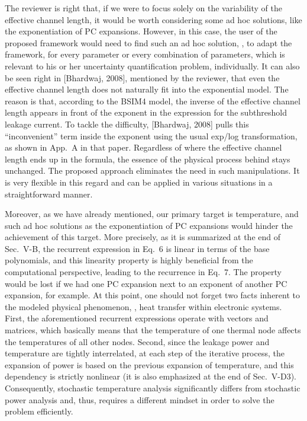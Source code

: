 \begin{authors}
The reviewer is right that, if we were to focus solely on the variability of the effective channel length, it would be worth considering some ad hoc solutions, like the exponentiation of PC expansions.
However, in this case, the user of the proposed framework would need to find such an ad hoc solution, \ie, to adapt the framework, for every parameter or every combination of parameters, which is relevant to his or her uncertainty quantification problem, individually.
It can also be seen right in [Bhardwaj, 2008], mentioned by the reviewer, that even the effective channel length does not naturally fit into the exponential model.
The reason is that, according to the BSIM4 model, the inverse of the effective channel length appears in front of the exponent in the expression for the subthreshold leakage current.
To tackle the difficulty, [Bhardwaj, 2008] pulls this ``inconvenient'' term inside the exponent using the usual exp/log transformation, as shown in App.~A in that paper.
Regardless of where the effective channel length ends up in the formula, the essence of the physical process behind stays unchanged.
The proposed approach eliminates the need in such manipulations.
It is very flexible in this regard and can be applied in various situations in a straightforward manner.

Moreover, as we have already mentioned, our primary target is temperature, and such ad hoc solutions as the exponentiation of PC expansions would hinder the achievement of this target.
More precisely, as it is summarized at the end of Sec.~V-B, the recurrent expression in Eq.~6 is linear in terms of the base polynomials, and this linearity property is highly beneficial from the computational perspective, leading to the recurrence in Eq.~7.
The property would be lost if we had one PC expansion next to an exponent of another PC expansion, for example.
At this point, one should not forget two facts inherent to the modeled physical phenomenon, \ie, heat transfer within electronic systems.
First, the aforementioned recurrent expressions operate with vectors and matrices, which basically means that the temperature of one thermal node affects the temperatures of all other nodes.
Second, since the leakage power and temperature are tightly interrelated, at each step of the iterative process, the expansion of power is based on the previous expansion of temperature, and this dependency is strictly nonlinear (it is also emphasized at the end of Sec.~V-D3).
Consequently, stochastic temperature analysis significantly differs from stochastic power analysis and, thus, requires a different mindset in order to solve the problem efficiently.


\end{authors}
